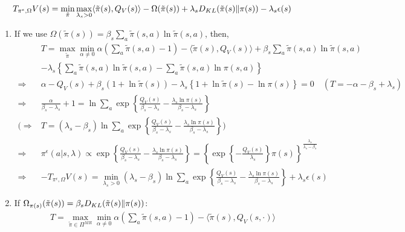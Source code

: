 \documentclass[a4paper]{article}
\begin{document}
\[
    T_{\pi^{\epsilon}, \Omega} V(s) = \min_{\tilde \pi} \max_{\lambda_s > 0} \langle \tilde \pi(s), Q_V(s) \rangle - \Omega(\tilde \pi(s)) + \lambda_s D_{KL}(\tilde \pi(s) \Arrowvert \pi(s)) - \lambda_s \epsilon(s)
\]
\begin{enumerate}
    \item 
    If we use $ \Omega(\tilde \pi(s)) = \beta_s \sum^{}_{a} \tilde \pi(s,a) \ln \tilde \pi(s,a)$, then,
    \begin{align*}
        & T = \max_{\tilde\pi} \min_{\alpha \ne 0} \alpha( \sum^{}_{a} \tilde \pi(s,a) - 1) - \langle \tilde \pi(s), Q_V(s) \rangle 
        + \beta_s \sum^{}_{a} \tilde \pi(s,a) \ln \tilde \pi(s,a) \\
        &- \lambda_s  \left\{ \sum^{}_{a} \tilde \pi(s,a) \ln \tilde \pi(s,a) - \sum^{}_{a} \tilde \pi(s,a) \ln \pi(s,a) \right\}\\
        \Rightarrow&
        \alpha - Q_V(s) + \beta_s(1 + \ln \tilde \pi(s)) - \lambda_s \left\{ 1 + \ln \tilde \pi(s) - \ln \pi(s) \right\} = 0
        \quad( T = -\alpha - \beta_s + \lambda_s)\\
        \Rightarrow& \frac{\alpha}{\beta_s - \lambda_s} + 1
        = \ln\sum^{}_{a} \exp\left\{ \frac{Q_V(s)}{\beta_s - \lambda_s} - \frac{\lambda_s \ln \pi(s)}{\beta_s-\lambda_s} \right\}\\
        (\Rightarrow& T = (\lambda_s - \beta_s)\ln\sum^{}_{a} \exp\left\{ \frac{Q_V(s)}{\beta_s - \lambda_s} - \frac{\lambda_s \ln \pi(s)}{\beta_s-\lambda_s} \right\})\\
        \Rightarrow&
        \pi^{\epsilon}(a | s, \lambda) \propto \exp\left\{ \frac{Q_V(s)}{\beta_s - \lambda_s} - \frac{\lambda_s \ln \pi(s)}{\beta_s-\lambda_s} \right\} 
        = {\left\{ \exp\left\{ -\frac{Q_V(s)}{\lambda_s}\right\} \pi(s) \right\}}^{\frac{\lambda_s}{\lambda_s - \beta_s} }\\
        \Rightarrow& -T_{\pi^{\epsilon}, \Omega}V(s) = \min_{\lambda_s > 0} (\lambda_s - \beta_s)\ln\sum^{}_{a} \exp\left\{ \frac{Q_V(s)}{\beta_s - \lambda_s} - \frac{\lambda_s \ln \pi(s)}{\beta_s-\lambda_s} \right\}  + \lambda_s \epsilon(s)
    \end{align*}
\item If $ \Omega_{\pi(s)}(\tilde \pi(s)) = \beta_s D_{KL}(\tilde \pi(s) \Arrowvert \pi(s)) $:
    \begin{align*}
        &T = \max_{\tilde \pi \in \Pi^{MR}} \min_{\alpha \ne 0} \alpha( \sum^{}_{a} \tilde \pi(s, a) - 1) 
    - \langle \tilde\pi(s), Q_{V}(s, \cdot) \rangle \\

\end{align*}
\end{enumerate}
\end{document}
